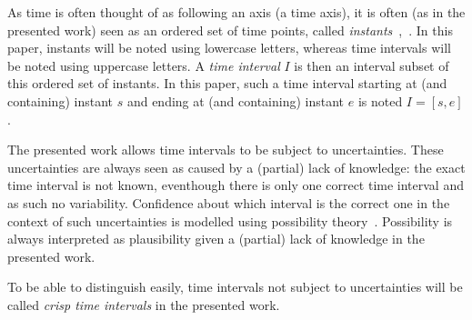 As time is often thought of as following an axis (a time axis), it is often (as in the presented work) seen as an ordered set of time points, called \emph{instants}~\cite{Dyreson1994},~\cite{Jensen1998}. In this paper, instants will be noted using lowercase letters, whereas time intervals will be noted using uppercase letters. A \emph{time interval} $I$ is then an interval subset of this ordered set of instants. In this paper, such a time interval starting at (and containing) instant $s$ and ending at (and containing) instant $e$ is noted $I = \left[s, e\right]$.

The presented work allows time intervals to be subject to uncertainties. These uncertainties are always seen as caused by a (partial) lack of knowledge: the exact time interval is not known, eventhough there is only one correct time interval and as such no variability. Confidence about which interval is the correct one in the context of such uncertainties is modelled using possibility theory~\cite{DidierDubois1988a}. Possibility is always interpreted as plausibility given a (partial) lack of knowledge in the presented work.

To be able to distinguish easily, time intervals not subject to uncertainties will be called \emph{crisp time intervals} in the presented work.